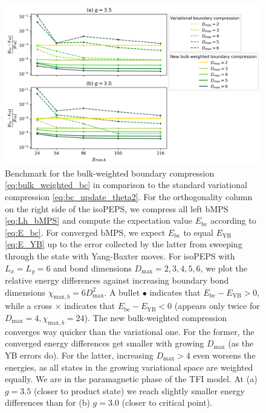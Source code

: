 \begin{figure}[H]
  \centering
  \includegraphics[width=1.0\linewidth]{boundary_compression_6_6.png}
  \caption{Benchmark for the bulk-weighted boundary compression \eqref{eq:bulk_weighted_bc} in comparison to the standard variational compression \eqref{eq:bc_update_theta2}. For the orthogonality column on the right side of the isoPEPS, we compress all left bMPS \eqref{eq:Lh_bMPS} and compute the expectation value $E_{\text{bc}}$ according to \eqref{eq:E_bc}. For converged bMPS, we expect $E_{\text{bc}}$ to equal $E_{\text{YB}}$ \eqref{eq:E_YB} up to the error collected by the latter from sweeping through the state with Yang-Baxter moves. For isoPEPS with $L_x = L_y = 6$ and bond dimensions $D_{\text{max}} = 2, 3, 4, 5, 6$, we plot the relative energy differences against increasing boundary bond dimensions $\chi_{\text{max},b} = 6D_{\text{max}}^2$. A bullet $\bullet$ indicates that $E_{\text{bc}} - E_{\text{YB}} > 0$, while a cross $\times$ indicates that $E_{\text{bc}} - E_{\text{YB}} < 0$ (appears only twice for $D_{\text{max}} = 4, \chi_{\text{max},b} = 24$). The new bulk-weighted compression converges way quicker than the variational one. For the former, the converged energy differences get smaller with growing $D_{\text{max}}$ (as the YB errors do). For the latter, increasing $D_{\text{max}} > 4$ even worsens the energies, as all states in the growing variational space are weighted equally. We are in the paramagnetic phase of the TFI model. At (a) $g = 3.5$ (closer to product state) we reach slightly smaller energy differences than for (b) $g = 3.0$ (closer to critical point).}
\label{fig:bc}
\end{figure}


